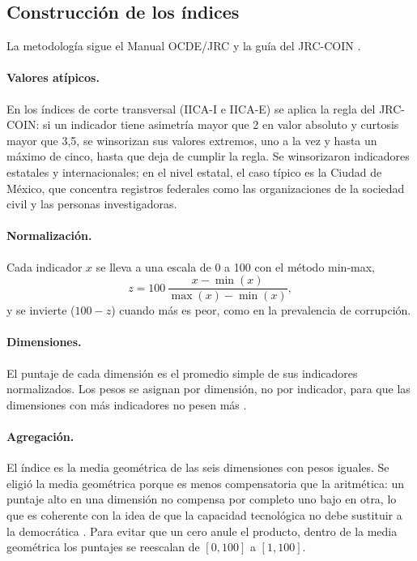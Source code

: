 \documentclass[11pt,a4paper]{article}
\begin{document}


\subsection{Construcción de los índices}

La metodología sigue el Manual OCDE/JRC \parencite{ocde_jrc_2008} y la guía del JRC-COIN \parencite{jrc_coin_2019}.

\paragraph{Valores atípicos.} En los índices de corte transversal (IICA-I e IICA-E) se aplica la regla del JRC-COIN: si un indicador tiene asimetría mayor que 2 en valor absoluto y curtosis mayor que 3,5, se winsorizan sus valores extremos, uno a la vez y hasta un máximo de cinco, hasta que deja de cumplir la regla. Se winsorizaron \NWinsorEst{} indicadores estatales y \NWinsorIntl{} internacionales; en el nivel estatal, el caso típico es la Ciudad de México, que concentra registros federales como las organizaciones de la sociedad civil y las personas investigadoras.

\paragraph{Normalización.} Cada indicador $x$ se lleva a una escala de 0 a 100 con el método min-max,
\[
  z = 100\,\frac{x-\min(x)}{\max(x)-\min(x)},
\]
y se invierte ($100-z$) cuando más es peor, como en la prevalencia de corrupción.

\paragraph{Dimensiones.} El puntaje de cada dimensión es el promedio simple de sus indicadores normalizados. Los pesos se asignan por dimensión, no por indicador, para que las dimensiones con más indicadores no pesen más \parencite{ocde_jrc_2008}.

\paragraph{Agregación.} El índice es la media geométrica de las seis dimensiones con pesos iguales. Se eligió la media geométrica porque es menos compensatoria que la aritmética: un puntaje alto en una dimensión no compensa por completo uno bajo en otra, lo que es coherente con la idea de que la capacidad tecnológica no debe sustituir a la democrática \parencite{zenteno_ica_2026,ocde_jrc_2008}. Para evitar que un cero anule el producto, dentro de la media geométrica los puntajes se reescalan de $[0,100]$ a $[1,100]$.
\end{document}
